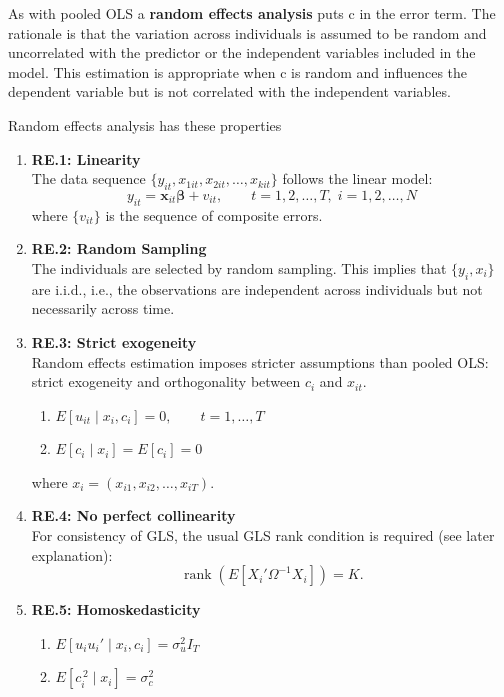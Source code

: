 \vspace{15pt}

As with pooled OLS a \textbf{random effects analysis} puts c in the error term. The rationale is that the variation across individuals is assumed to be random and uncorrelated with the predictor or the independent variables included in the model. This estimation is appropriate when c is random and influences the dependent variable but is not correlated with the independent variables. 

Random effects analysis has these properties

\begin{enumerate}

    \item \textbf{RE.1: Linearity} \\
    The data sequence $\{y_{it}, x_{1it}, x_{2it}, \ldots, x_{kit}\}$ follows the linear model:
    \[
    y_{it} = \mathbf{x}_{it}\boldsymbol{\beta} + v_{it},
    \qquad 
    t = 1,2,\ldots,T,\; i = 1,2,\ldots,N
    \]
    where $\{v_{it}\}$ is the sequence of composite errors.

    \item \textbf{RE.2: Random Sampling} \\
    The individuals are selected by random sampling.  
    This implies that $\{y_i, x_i\}$ are i.i.d., i.e., the observations are independent across individuals but not necessarily across time.

    \item \textbf{RE.3: Strict exogeneity} \\
    Random effects estimation imposes stricter assumptions than pooled OLS: strict exogeneity and orthogonality between $c_i$ and $x_{it}$.  
    \begin{enumerate}
        \item[(a)] $E[u_{it} \mid x_i, c_i] = 0, \qquad t = 1,\ldots,T$
        \item[(b)] $E[c_i \mid x_i] = E[c_i] = 0$
    \end{enumerate}
    where $x_i = (x_{i1}, x_{i2}, \ldots, x_{iT})$.

    \item \textbf{RE.4: No perfect collinearity} \\
    For consistency of GLS, the usual GLS rank condition is required (see later explanation):
    \[
    \operatorname{rank}\!\left( E\!\left[ X_i' \Omega^{-1} X_i \right] \right) = K.
    \]

    \item \textbf{RE.5: Homoskedasticity} \\
    \begin{enumerate}
        \item[(a)] $E[u_i u_i' \mid x_i, c_i] = \sigma_u^2 I_T$
        \item[(b)] $E[c_i^{\,2} \mid x_i] = \sigma_c^2$
    \end{enumerate}

\end{enumerate}

